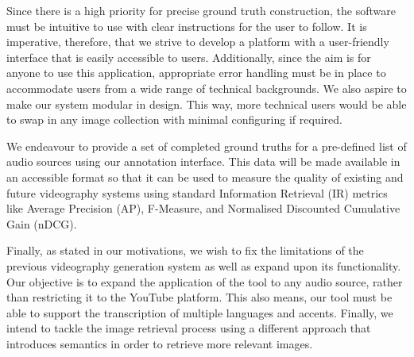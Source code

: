 \documentclass{l4proj}
\begin{document}
Since there is a high priority for precise ground truth construction, the software must be intuitive to use with clear instructions for the user to follow. It is imperative, therefore, that we strive to develop a platform with a user-friendly interface that is easily accessible to users. Additionally, since the aim is for anyone to use this application, appropriate error handling must be in place to accommodate users from a wide range of technical backgrounds. We also aspire to make our system modular in design. This way, more technical users would be able to swap in any image collection with minimal configuring if required.

We endeavour to provide a set of completed ground truths for a pre-defined list of audio sources using our annotation interface. This data will be made available in an accessible format so that it can be used to measure the quality of existing and future videography systems using standard Information Retrieval (IR) metrics like Average Precision (AP), F-Measure, and Normalised Discounted Cumulative Gain (nDCG).

Finally, as stated in our motivations, we wish to fix the limitations of the previous videography generation system as well as expand upon its functionality. Our objective is to expand the application of the tool to any audio source, rather than restricting it to the YouTube platform. This also means, our tool must be able to support the transcription of multiple languages and accents. Finally, we intend to tackle the image retrieval process using a different approach that introduces semantics in order to retrieve more relevant images.




\end{document}

